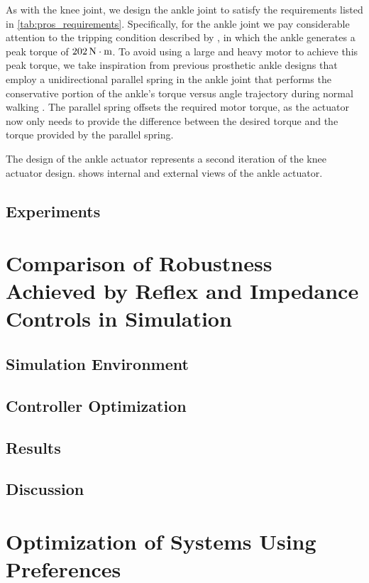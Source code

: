 As with the knee joint, we design the ankle joint to satisfy the requirements
listed in \cref{tab:pros_requirements}. Specifically, for the ankle joint we pay
considerable attention to the tripping condition described by
\citet{pijnappels2005early}, in which the ankle generates a  peak torque of
$\unit[202]{N \cdot m}$. To avoid using a large and heavy motor to achieve this
peak torque, we take inspiration from previous prosthetic ankle designs that
employ a unidirectional parallel spring in the ankle joint that performs the
conservative portion of the ankle's torque versus angle trajectory during normal
walking
\citep{au2007biomechanical,au2008powered,sup2009preliminary,lawson2014robotic}.
The parallel spring offsets the required motor torque, as the actuator now only
needs to provide the difference between the desired torque and the torque
provided by the parallel spring.

The design of the ankle actuator represents a second iteration of the knee
actuator design.  shows internal and external views of
the ankle actuator.

\subsection{Experiments}
\section{Comparison of Robustness Achieved by Reflex and Impedance Controls in
    Simulation}\label{sec:completed_comparison}

\subsection{Simulation Environment}\label{sec:sec_simulation_environ}

\subsection{Controller Optimization}\label{sec:completed_comparison_opt}

\subsection{Results}\label{sec:completed_comparison_results}

\subsection{Discussion}\label{sec:completed_comparison_discuss}

\section{Optimization of Systems Using
    Preferences}\label{sec:completed_pref_opt}
